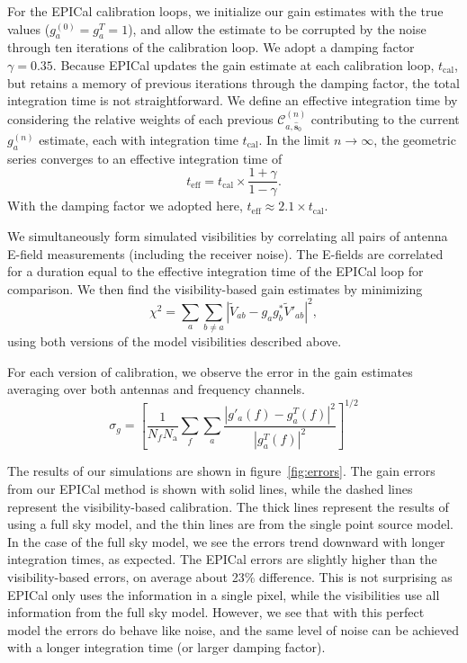 \documentclass[a4paper,fleqn,usenatbib]{mnras}
\newcommand{\Nant}{\ensuremath{N_{\mathrm{a}}}}
\newcommand{\spix}{\ensuremath{\hat{\mathbf{s}}_{0}}}
\newcommand{\Cna}[1][n]{\ensuremath{\mathcal{C}^{(#1)}_{a,\spix}}}
\newcommand{\V}{\ensuremath{\widetilde{V}}}
\newcommand{\damp}{\ensuremath{\gamma}}
\newcommand{\tcal}{\ensuremath{t_{\mathrm{cal}}}}
\newcommand{\teff}{\ensuremath{t_{\mathrm{eff}}}}
\begin{document}
For the EPICal calibration loops, we initialize our gain estimates with the true values (${g^{(0)}_a=g^T_a=1}$), and allow the estimate to be corrupted by the noise through ten iterations of the calibration loop. We adopt a damping factor $\damp=0.35$. Because EPICal updates the gain estimate at each calibration loop, \tcal, but retains a memory of previous iterations through the damping factor, the total integration time is not straightforward. We define an effective integration time by considering the relative weights of each previous $\Cna$ contributing to the current $g^{(n)}_a$ estimate, each with integration time \tcal. In the limit $n\rightarrow \infty$, the geometric series converges to an effective integration time of
\begin{equation}
\teff = \tcal \times \frac{1+\damp}{1-\damp}.
\end{equation}
With the damping factor we adopted here, $\teff \approx 2.1 \times \tcal$. 

We simultaneously form simulated visibilities by correlating all pairs of antenna E-field measurements (including the receiver noise). The E-fields are correlated for a duration equal to the effective integration time of the EPICal loop for comparison. We then find the visibility-based gain estimates by minimizing
\begin{equation}\label{eq:vis_cal}
\chi^2 = \sum_a\sum_{b\ne a} \left|\V_{ab}-g_a g_b^* \V'_{ab}\right|^2,
\end{equation}
using both versions of the model visibilities described above.

 For each version of calibration, we observe the error in the gain estimates averaging over both antennas and frequency channels.
\begin{equation}\label{eq:gain_error}
\sigma_g = \left[\frac{1}{N_f \Nant} \sum_f \sum_a \frac{\left|g'_a(f)-g^T_a(f)\right|^2}{\left|g^T_a(f)\right|^2}\right]^{1/2}
\end{equation}

The results of our simulations are shown in figure~\ref{fig:errors}. The gain errors from our EPICal method is shown with solid lines, while the dashed lines represent the visibility-based calibration. The thick lines represent the results of using a full sky model, and the thin lines are from the single point source model.  In the case of the full sky model, we see the errors trend downward with longer integration times, as expected. The EPICal errors are slightly higher than the visibility-based errors, on average about 23\% difference. This is not surprising as EPICal only uses the information in a single pixel, while the visibilities use all information from the full sky model. However, we see that with this perfect model the errors do behave like noise, and the same level of noise can be achieved with a longer integration time (or larger damping factor).
\end{document}
